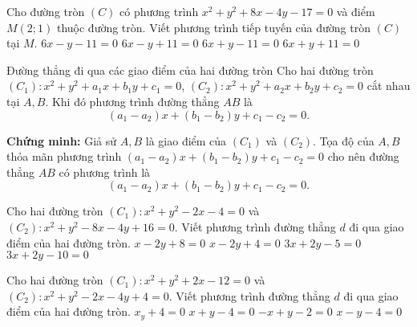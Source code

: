 \begin{vd}%
	Cho đường tròn $(C)$ có phương trình $x^2+y^2+8x-4y-17=0$ và điểm $M(2;1)$ thuộc đường tròn. 
	Viết phương trình tiếp tuyến của đường tròn $(C)$ tại $M$.
\choice
{\True $6x-y-11=0$}
{$6x-y+11=0$}
{$6x+y-11=0$}
{$6x+y+11=0$}
\end{vd}

\begin{dang}{Đường thẳng đi qua các giao điểm của hai đường tròn}
Cho hai đường tròn $(C_1) \colon x^2 +y^2+a_1x+b_1y+c_1 =0$,  $(C_2) \colon x^2 +y^2+a_2x+b_2y+c_2 =0$ cắt nhau tại $A,B$. Khi đó phương trình đường thẳng $AB$ là  \[(a_1-a_2)x +(b_1-b_2)y+c_1-c_2=0. \]
\end{dang}
\noindent \textbf{Chứng minh:} Giả sử $A,B$ là giao điểm của $(C_1)$ và $(C_2)$. Tọa độ của $A,B$ thỏa mãn phương trình $(a_1-a_2)x +(b_1-b_2)y+c_1-c_2=0$ cho nên đường thẳng  $AB$ có phương trình là \[(a_1-a_2)x +(b_1-b_2)y+c_1-c_2=0. \]
\begin{vd}%
Cho hai đường tròn $(C_1) \colon x^2+y^2-2x-4=0$ và $(C_2) \colon x^2+y^2-8x-4y+16=0$. Viết phương trình đường thẳng $d$ đi qua giao điểm của hai đường tròn.
\choice
{$x-2y+8=0$}
{$x-2y+4=0$}
{$3x+2y-5=0$}
{\True $3x+2y-10=0$}
\end{vd}

\begin{vd}%
Cho hai đường tròn $(C_1) \colon x^2+y^2+2x-12=0$ và $(C_2) \colon x^2+y^2-2x-4y+4=0$. Viết phương trình đường thẳng $d$ đi qua giao điểm của hai đường tròn.
\choice
{$x_y+4=0$}
{\True $x+y-4=0$}
{$-x+y-2=0$}
{\True $x-y-4=0$}
\end{vd}
